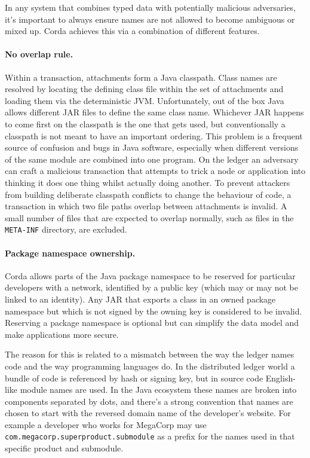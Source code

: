 \documentclass{article}
\begin{document}
In any system that combines typed data with potentially malicious adversaries, it's important to always ensure
names are not allowed to become ambiguous or mixed up. Corda achieves this via a combination of different features.

\paragraph{No overlap rule.}Within a transaction, attachments form a Java classpath. Class names are resolved by
locating the defining class file within the set of attachments and loading them via the deterministic JVM.
Unfortunately, out of the box Java allows different JAR files to define the same class name. Whichever JAR happens
to come first on the classpath is the one that gets used, but conventionally a classpath is not meant to have an
important ordering. This problem is a frequent source of confusion and bugs in Java software, especially when
different versions of the same module are combined into one program. On the ledger an adversary can craft a
malicious transaction that attempts to trick a node or application into thinking it does one thing whilst actually
doing another. To prevent attackers from building deliberate classpath conflicts to change the behaviour of code, a
transaction in which two file paths overlap between attachments is invalid. A small number of files that are
expected to overlap normally, such as files in the \texttt{META-INF} directory, are excluded.

\paragraph{Package namespace ownership.}Corda allows parts of the Java package namespace to be reserved for
particular developers with a network, identified by a public key (which may or may not be linked to an identity). Any JAR
that exports a class in an owned package namespace but which is not signed by the owning key is considered to be
invalid. Reserving a package namespace is optional but can simplify the data model and make applications more
secure.

The reason for this is related to a mismatch between the way the ledger names code and the way programming
languages do. In the distributed ledger world a bundle of code is referenced by hash or signing key, but in source
code English-like module names are used. In the Java ecosystem these names are broken into components separated by
dots, and there's a strong convention that names are chosen to start with the reversed domain name of the
developer's website. For example a developer who works for MegaCorp may use
\texttt{com.megacorp.superproduct.submodule} as a prefix for the names used in that specific product and submodule.
\end{document}
